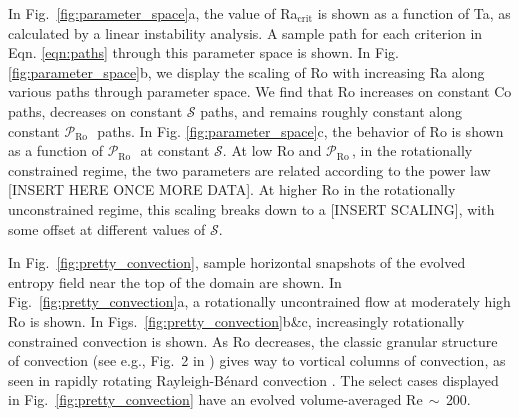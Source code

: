\documentclass[twocolumn, amsmath, amsfonts, amssymb]{aastex62}
\newcommand{\RB}{Rayleigh-B\'{e}nard }
\newcommand{\pro}{\ensuremath{\mathcal{P}_{\text{Ro}}\,}}
\begin{document}
\label{sec:results}
In Fig.~\ref{fig:parameter_space}a, the value of Ra$_{\text{crit}}$
is shown as a function of Ta, as
calculated by a linear instability analysis. A sample path for
each criterion in Eqn. \ref{eqn:paths} through
this parameter space is shown.
In Fig. \ref{fig:parameter_space}b, we display the scaling of Ro
with increasing Ra along various paths through parameter space.
We find that Ro increases on constant Co paths, decreases on constant $\mathcal{S}$
paths, and remains roughly constant along constant \pro$\,$ paths.
In Fig. \ref{fig:parameter_space}c, the behavior of Ro is shown as
a function of \pro$\,$ at constant $\mathcal{S}$.
At low Ro and \pro, in the rotationally constrained regime, the two parameters
are related according to the power law [INSERT HERE ONCE MORE DATA].
At higher Ro in the rotationally unconstrained regime, this scaling breaks down
to a [INSERT SCALING], with some offset at different values of $\mathcal{S}$.


In Fig.~\ref{fig:pretty_convection}, sample horizontal snapshots of the evolved entropy field
near the top of the domain are shown. 
In Fig.~\ref{fig:pretty_convection}a, a rotationally uncontrained flow at moderately high
Ro is shown. In Figs.~\ref{fig:pretty_convection}b\&c, increasingly rotationally constrained
convection is shown.
As Ro decreases, the
classic granular structure of convection (see e.g., Fig.~2 in \AB) gives way to vortical
columns of convection, as seen in rapidly rotating \RB convection \citep{stellmach&all2014}.
The select cases displayed in Fig.~\ref{fig:pretty_convection} have an evolved volume-averaged
Re$\,\sim\,$200.
\end{document}
